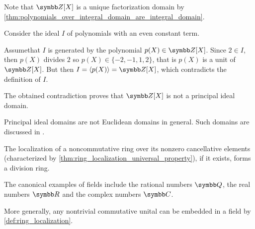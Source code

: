 \begin{example}
\begin{description}
    Note that \( \Z[X] \) is a unique factorization domain by \cref{thm:polynomials_over_integral_domain_are_integral_domain}.

    Consider the ideal \( I \) of polynomials with an even constant term.

    Assume\LEM that \( I \) is generated by the polynomial \( p(X) \in \Z[X] \). Since \( 2 \in I \), then \( p(X) \) divides \( 2 \) so \( p(X) \in \{ -2, -1, 1, 2 \} \), that is \( p(X) \) is a unit of \( \Z[X] \). But then \( I = \Gen{p(X)} = \Z[X] \), which contradicts the definition of \( I \).

    The obtained contradiction proves that \( \Z[X] \) is not a principal ideal domain.

     Principal ideal domains are not Euclidean domains in general. Such domains are discussed in \cite{Anderson1986}.

     The localization of a noncommutative ring over its nonzero cancellative elements (characterized by \cref{thm:ring_localization_universal_property}), if it exists, forms a division ring.

     The canonical examples of fields include the rational numbers \( \Q \), the real numbers \( \R \) and the complex numbers \( \Co \).

    More generally, any nontrivial commutative unital can be embedded in a field by \cref{def:ring_localization}.
  \end{description}
\end{example}

